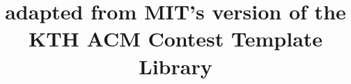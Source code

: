 \documentclass[10pt, letterpaper, notitlepage]{report}
\title{adapted from MIT's version of the KTH ACM Contest Template Library}{\today} %
\begin{document}
	\maketeampage
	\begin{multicols*}{3}
	\thispagestyle{fancy}
	\end{multicols*}

\end{document}
